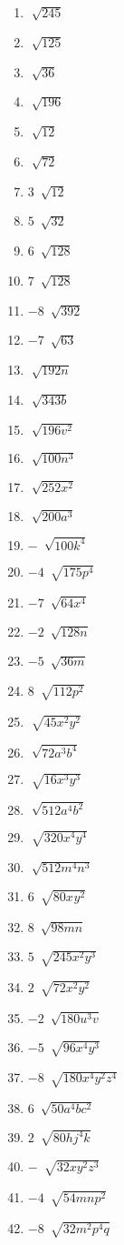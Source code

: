 \documentclass[12pt]{article}
\theoremstyle{definition}
\begin{document}
\begin{multicols}{4}
\begin{enumerate}
	\item $\sqrt[]{245}$
	\item $\sqrt[]{125}$
  \item $\sqrt[]{36}$
  \item $\sqrt[]{196}$
  \item $\sqrt[]{12}$
  \item $\sqrt[]{72}$
  \item $3~\sqrt[]{12}$
  \item $5~\sqrt[]{32}$
  \item $6~\sqrt[]{128}$
  \item $7~\sqrt[]{128}$
  \item $- 8~\sqrt[]{392}$
  \item $- 7~\sqrt[]{63}$
  \item $\sqrt[]{192 n}$
  \item $\sqrt[]{343 b}$
  \item $\sqrt[]{196 v^2}$
  \item $\sqrt[]{100 n^3}$
  \item $\sqrt[]{252 x^2}$
  \item $\sqrt[]{200 a^3}$
  \item $-~\sqrt[]{100 k^4}$
  \item $- 4~\sqrt[]{175 p^4}$
  \item $- 7~\sqrt[]{64 x^4}$
  \item $- 2~\sqrt[]{128 n}$
  \item $- 5~\sqrt[]{36 m}$
  \item $8~\sqrt[]{112 p^2}$
  \item $\sqrt[]{45 x^2 y^2}$
  \item $\sqrt[]{72 a^3 b^4}$
  \item $\sqrt[]{16 x^3 y^3}$
  \item $\sqrt[]{512 a^4 b^2}$
  \item $\sqrt[]{320 x^4 y^4}$
  \item $\sqrt[]{512 m^4 n^3}$
  \item $6~\sqrt[]{80 x^{} y^2}$
  \item $8~\sqrt[]{98 m n}$
  \item $5~\sqrt[]{245 x^2 y^3}$
  \item $2~\sqrt[]{72 x^2 y^2}$
  \item $- 2~\sqrt[]{180 u^3 v}$
  \item $- 5~\sqrt[]{96 x^4 y^3}$
  \item $- 8~\sqrt[]{180 x^4 y^2 z^4}$
  \item $6~\sqrt[]{50 a^4 b c^2}$
  \item $2~\sqrt[]{80 h j^4 k}$
  \item $-~\sqrt[]{32 x y^2 z^3}$
  \item $- 4~\sqrt[]{54 m n p^2}$
  \item $- 8~\sqrt[]{32 m^2 p^4 q}$
\end{enumerate}
\end{multicols}
\newpage
\end{document}
